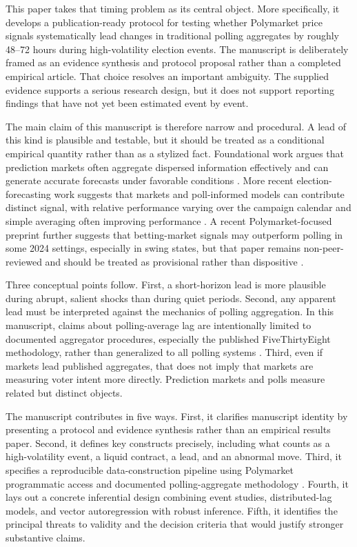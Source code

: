 \documentclass[11pt]{article}
\begin{document}
This paper takes that timing problem as its central object. More specifically, it develops a publication-ready protocol for testing whether Polymarket price signals systematically lead changes in traditional polling aggregates by roughly 48--72 hours during high-volatility election events. The manuscript is deliberately framed as an evidence synthesis and protocol proposal rather than a completed empirical article. That choice resolves an important ambiguity. The supplied evidence supports a serious research design, but it does not support reporting findings that have not yet been estimated event by event.

The main claim of this manuscript is therefore narrow and procedural. A lead of this kind is plausible and testable, but it should be treated as a conditional empirical quantity rather than as a stylized fact. Foundational work argues that prediction markets often aggregate dispersed information effectively and can generate accurate forecasts under favorable conditions \citep{predictionmarkets2004aeaweb}. More recent election-forecasting work suggests that markets and poll-informed models can contribute distinct signal, with relative performance varying over the campaign calendar and simple averaging often improving performance \citep{modelsmarketsandth2021arxiv}. A recent Polymarket-focused preprint further suggests that betting-market signals may outperform polling in some 2024 settings, especially in swing states, but that paper remains non-peer-reviewed and should be treated as provisional rather than dispositive \citep{arebettingmarketsb2025arxiv}.

Three conceptual points follow. First, a short-horizon lead is more plausible during abrupt, salient shocks than during quiet periods. Second, any apparent lead must be interpreted against the mechanics of polling aggregation. In this manuscript, claims about polling-average lag are intentionally limited to documented aggregator procedures, especially the published FiveThirtyEight methodology, rather than generalized to all polling systems \citep{howourpollingavera2023fivethir}. Third, even if markets lead published aggregates, that does not imply that markets are measuring voter intent more directly. Prediction markets and polls measure related but distinct objects.

The manuscript contributes in five ways. First, it clarifies manuscript identity by presenting a protocol and evidence synthesis rather than an empirical results paper. Second, it defines key constructs precisely, including what counts as a high-volatility event, a liquid contract, a lead, and an abnormal move. Third, it specifies a reproducible data-construction pipeline using Polymarket programmatic access and documented polling-aggregate methodology \citep{introductionpolymandpolymark, howourpollingavera2023fivethir}. Fourth, it lays out a concrete inferential design combining event studies, distributed-lag models, and vector autoregression with robust inference. Fifth, it identifies the principal threats to validity and the decision criteria that would justify stronger substantive claims.
\end{document}

